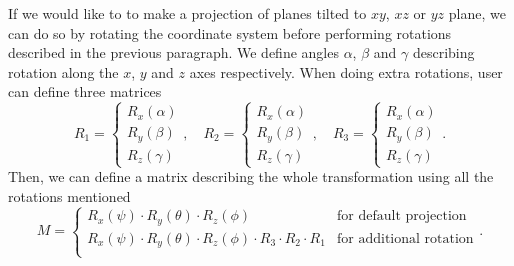 \documentclass[11pt,a4paper]{article}
\begin{document}
If we would like to to make a projection of planes tilted to $ xy $, $ xz $ or $ yz $ plane, we can do so by rotating the coordinate system before performing rotations described in the previous paragraph. We define angles $ \alpha $, $ \beta $ and $ \gamma $ describing rotation along the $ x $, $ y $ and $ z $ axes respectively. When doing extra rotations, user can define three matrices
\begin{equation}
R_{1}=
\begin{cases}
R_x(\alpha) \\
R_y(\beta) \\
R_z(\gamma)
\end{cases}, \quad
R_{2}=
\begin{cases}
R_x(\alpha) \\
R_y(\beta) \\
R_z(\gamma)
\end{cases}, \quad
R_{3}=
\begin{cases}
R_x(\alpha) \\
R_y(\beta) \\
R_z(\gamma)
\end{cases}.
\end{equation}
Then, we can define a matrix describing the whole transformation using all the rotations mentioned
\begin{equation}
M=
\begin{cases}
R_x(\psi) \cdot R_y(\theta) \cdot R_z(\phi) & \text{for default projection} \\
R_x(\psi) \cdot R_y(\theta) \cdot R_z(\phi) \cdot R_3 \cdot R_2 \cdot R_1 & \text{for additional rotation} \\
\end{cases}.
\end{equation}
\end{document}

